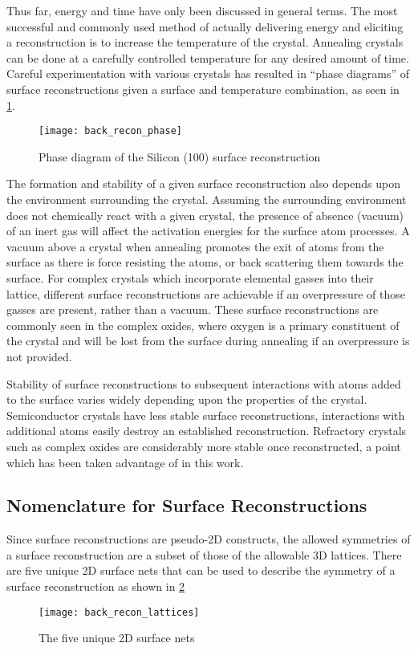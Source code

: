 Thus far, energy and time have only been discussed in general terms. The most successful and commonly used method of actually delivering energy and eliciting a reconstruction is to increase the temperature of the crystal. Annealing crystals can be done at a carefully controlled temperature for any desired amount of time. Careful experimentation with various crystals has resulted in ``phase diagrams'' of surface reconstructions given a surface and temperature combination, as seen in \cref{fig:back_recon_phase}.
\begin{figure}
    \centering
    \texttt{[image: back\_recon\_phase]}
    \caption{\label{fig:back_recon_phase}Phase diagram of the Silicon (100) surface reconstruction\cite{Pehlke1991}}
\end{figure}

The formation and stability of a given surface reconstruction also depends upon the environment surrounding the crystal. Assuming the surrounding environment does not chemically react with a given crystal, the presence of absence (vacuum) of an inert gas will affect the activation energies for the surface atom processes. A vacuum above a crystal when annealing promotes the exit of atoms from the surface as there is force resisting the atoms, or back scattering them towards the surface. For complex crystals which incorporate elemental gasses into their lattice, different surface reconstructions are achievable if an overpressure of those gasses are present, rather than a vacuum. These surface reconstructions are commonly seen in the complex oxides, where oxygen is a primary constituent of the crystal and will be lost from the surface during annealing if an overpressure is not provided.

Stability of surface reconstructions to subsequent interactions with atoms added to the surface varies widely depending upon the properties of the crystal. Semiconductor crystals have less stable surface reconstructions, interactions with additional atoms easily destroy an established reconstruction. Refractory crystals such as complex oxides are considerably more stable once reconstructed, a point which has been taken advantage of in this work.

\subsection{Nomenclature for Surface Reconstructions}
Since surface reconstructions are pseudo-2D constructs, the allowed symmetries of a surface reconstruction are a subset of those of the allowable 3D lattices. There are five unique 2D surface nets that can be used to describe the symmetry of a surface reconstruction as shown in \cref{fig:back_recon_lattices}
\begin{figure}
    \centering
    \texttt{[image: back\_recon\_lattices]}
    \caption{\label{fig:back_recon_lattices}The five unique 2D surface nets\cite{ohring2001materials}}
\end{figure}

